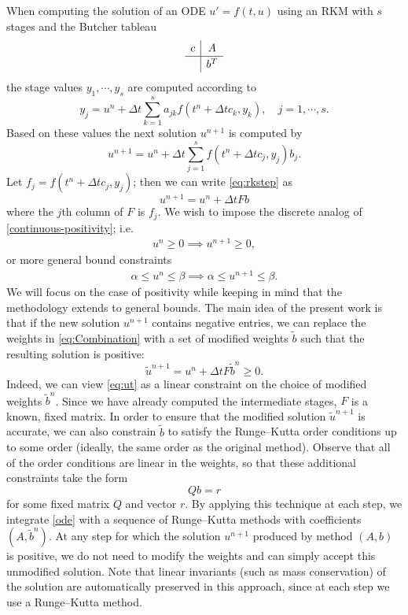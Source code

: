 \documentclass[a4paper]{article}
\numberwithin{equation}{section}
\theoremstyle{plain}
\theoremstyle{definition}
\numberwithin{theorem}{section}
\newcommand{\dt}{{\Delta t}}
\newcommand{\1}{\mathbbm{1}}
\newcommand{\ut}{\tilde{u}}
\newcommand{\bt}{\tilde{b}}
\begin{document}
When computing the solution of an ODE $u ' = f(t,u) $ using an RKM with $s$ stages and the Butcher tableau
\begin{align}
\renewcommand{\arraystretch}{1.2}
\begin{array}{c|c}
c &  A \\
\hline
 & b^T\\
\end{array}
\end{align}
the stage values $y_1,\cdots,y_s$ are computed according to
\begin{equation}\label{eq:stagevalues}
y_j =  u^n + \dt \sum_{k = 1}^{s} a_{jk} f(t^n + \dt c_k,y_k),  \quad j = 1,\cdots,s.
\end{equation}
Based on these values the next solution $u^{n+1}$ is computed by
\begin{equation} \label{eq:rkstep}
u^{n+1} = u^n + \dt \sum_{j  = 1}^s f(t^n + \dt c_j,y_j) b_j .
\end{equation}
Let $f_j = f(t^n + \dt c_j,y_j)$; then we can write \eqref{eq:rkstep} as
\begin{equation}\label{eq:Combination}
u^{n+1} = u^n + \dt F b
\end{equation}
where the $j$th column of $F$ is $f_j$.
We wish to impose the discrete analog of \eqref{continuous-positivity}; i.e.
\begin{align} \label{positivity}
    u^n\ge 0 \implies u^{n+1} \ge 0,
\end{align}
or more general bound constraints
\begin{align}
    \alpha \le u^n\le \beta \implies \alpha \le u^{n+1} \le \beta.
\end{align}
We will focus on the case of positivity while keeping in mind that
the methodology extends to general bounds.
The main idea of the present work is that if the new solution $u^{n+1}$ contains
negative entries, we can replace the weights in \eqref{eq:Combination} with
a set of modified weights $\bt$ such that the resulting solution is positive:
\begin{equation}\label{eq:ut}
\ut^{n+1} = u^n + \dt F \bt^n \ge 0.
\end{equation}
Indeed, we can view \eqref{eq:ut} as a linear constraint on the choice of
modified weights $\bt^n$.  Since we have already computed the intermediate stages,
$F$ is a known, fixed matrix.  In order to ensure that the modified solution $\ut^{n+1}$
is accurate, we can also constrain $\bt$ to satisfy the Runge--Kutta order conditions
up to some order (ideally, the same order as the original method).  Observe that
all of the order conditions are linear in the weights, so that these additional constraints
take the form
$$
Qb = r
$$
for some fixed matrix $Q$ and vector $r$.
By applying this technique at each step, we integrate \eqref{ode} with a
sequence of Runge--Kutta methods with coefficients $(A,\bt^n)$.  At any step
for which the solution $u^{n+1}$ produced by method $(A,b)$ is positive, we do not
need to modify the weights and can simply accept this unmodified solution.
Note that linear invariants (such as mass conservation) of the solution are
automatically preserved in this approach, since at each step we use a Runge--Kutta
method.
\end{document}

